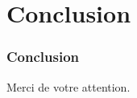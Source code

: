 \section{Conclusion}
\begin{frame}
	\frametitle{Conclusion}
		\begin{center}
            {\LARGE Merci de votre attention.}
	\end{center}
	
\end{frame}

